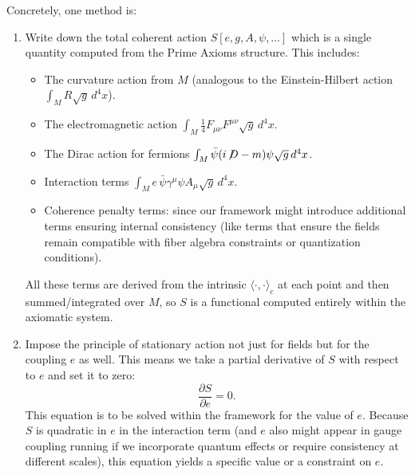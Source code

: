 \documentclass[11pt]{article}
\begin{document}
Concretely, one method is:
\begin{enumerate}
\item Write down the total coherent action $S[e, g, A, \psi, \dots]$ which is a single quantity computed from the Prime Axioms structure. This includes:
    \begin{itemize}
        \item The curvature action from $M$ (analogous to the Einstein-Hilbert action $\int_M R \sqrt{g}\,d^4x$).
        \item The electromagnetic action $\int_M \frac{1}{4}F_{\mu\nu}F^{\mu\nu}\sqrt{g}\,d^4x$.
        \item The Dirac action for fermions $\int_M \bar{\psi}(i\!\not\!D - m)\psi \sqrt{g}\,d^4x$.
        \item Interaction terms $\int_M e\,\bar{\psi}\gamma^\mu \psi A_\mu \sqrt{g}\,d^4x$.
        \item Coherence penalty terms: since our framework might introduce additional terms ensuring internal consistency (like terms that ensure the fields remain compatible with fiber algebra constraints or quantization conditions).
    \end{itemize}
    All these terms are derived from the intrinsic $\langle\cdot,\cdot\rangle_c$ at each point and then summed/integrated over $M$, so $S$ is a functional computed entirely within the axiomatic system.
\item Impose the principle of stationary action not just for fields but for the coupling $e$ as well. This means we take a partial derivative of $S$ with respect to $e$ and set it to zero:
    \[
    \frac{\partial S}{\partial e} = 0.
    \]
    This equation is to be solved within the framework for the value of $e$. Because $S$ is quadratic in $e$ in the interaction term (and $e$ also might appear in gauge coupling running if we incorporate quantum effects or require consistency at different scales), this equation yields a specific value or a constraint on $e$.
\end{enumerate}
\end{document}
